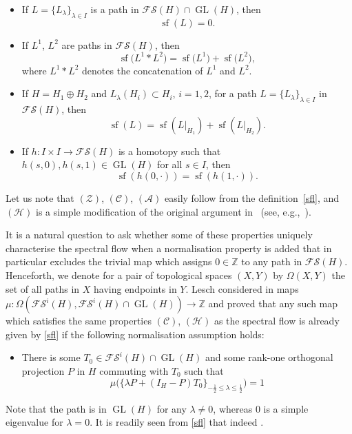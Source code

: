 \documentclass[pdftex]{sigma}
\numberwithin{equation}{section}
\theoremstyle{definition}
\DeclareMathOperator{\sfl}{sf}
\DeclareMathOperator{\GL}{GL}
\begin{document}
\begin{itemize}\itemsep=0pt
 \item[$(\mathcal{Z})$] If $L=\{L_\lambda\}_{\lambda\in I}$ is a path in $\mathcal{FS}(H)\cap\GL(H)$, then
\[
 \sfl(L)=0.
\]
 \item[$(\mathcal{C})$] If $L^1$, $L^2$ are paths in $\mathcal{FS}(H)$, then
 \[\sfl\bigl(L^1\ast L^2\bigr)=\sfl\bigl(L^1\bigr)+\sfl\bigl(L^2\bigr),\]
 where $L^1\ast L^2$ denotes the concatenation of $L^1$ and $L^2$.
 \item[$(\mathcal{A})$] If $H=H_1\oplus H_2$ and $L_\lambda(H_i)\subset H_i$, $i=1,2$, for a path $L=\{L_\lambda\}_{\lambda\in I}$ in $\mathcal{FS}(H)$, then
 \[\sfl(L)=\sfl(L|_{H_1})+\sfl(L|_{H_2}).\]
 \item[$(\mathcal{H})$] If $h \colon I\times I\rightarrow\mathcal{FS}(H)$ is a homotopy such that $h(s,0), h(s,1)\in\GL(H)$ for all $s\in I$, then
 \[\sfl(h(0,\cdot))=\sfl(h(1,\cdot)).\]
\end{itemize}
Let us note that $(\mathcal{Z})$, $(\mathcal{C})$, $(\mathcal{A})$ easily follow from the definition~\eqref{sfl}, and $(\mathcal{H})$ is a simple modification of the original argument in~\cite{Phillips} (see, e.g.,~\cite{CompSfl}).

It is a natural question to ask whether some of these properties uniquely characterise the spectral flow when a normalisation property is added that in particular excludes the trivial map which assigns $0\in\mathbb{Z}$ to any path in $\mathcal{FS}(H)$. Henceforth, we denote for a pair of topological spaces $(X,Y)$ by $\Omega(X,Y)$ the set of all paths in $X$ having endpoints in $Y$. Lesch considered in \cite{Lesch} maps $\mu \colon \Omega(\mathcal{FS}^i(H),\mathcal{FS}^i(H)\cap\GL(H))\rightarrow\mathbb{Z}$ and proved that any such map which satisfies the same properties $(\mathcal{C})$, $(\mathcal{H})$ as the spectral flow is already given by \eqref{sfl} if the following normalisation assumption holds:
\begin{itemize}\itemsep=0pt
\item[$\mathcal{(N)}$] There is some $T_0\in\mathcal{FS}^i(H)\cap\GL(H)$ and some rank-one orthogonal projection $P$ in $H$ commuting with $T_0$ such that
\[ \mu\bigl(\{\lambda P+(I_H-P)T_0\}_{-\frac{1}{2}\leq\lambda\leq\frac{1}{2}} \bigr)=1 \]
\end{itemize}
Note that the path  is in $\GL(H)$ for any $\lambda\neq 0$, whereas $0$ is a simple eigenvalue for $\lambda=0$. It is readily seen from \eqref{sfl} that indeed \smash{$\sfl(\{\lambda P\hspace{-0.2pt}+(I_H\hspace{-0.2pt}-P)T_0\}{}_{\smash{-\frac{1}{2}\leq\lambda\leq\frac{1}{2}}} )=1$}.
\end{document}
